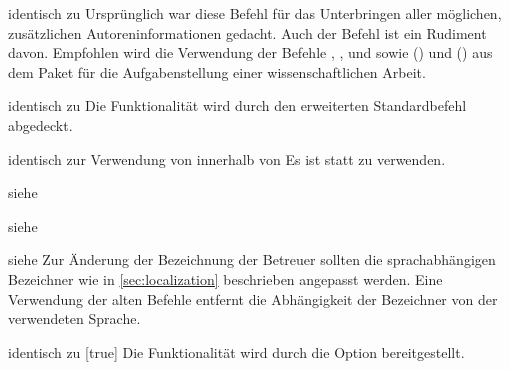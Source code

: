 \begin{Declaration*}{}
\begin{Declaration}{}{%
  identisch zu %
}
\printdeclarationlist*%
%
Ursprünglich war diese Befehl für das Unterbringen aller möglichen, 
zusätzlichen Autoreninformationen gedacht. Auch der Befehl  
ist ein Rudiment davon. Empfohlen wird die Verwendung der Befehle 
, ,  und 
 sowie () 
und () aus dem Paket 
 für die Aufgabenstellung einer wissenschaftlichen 
Arbeit.
\end{Declaration}

\begin{Declaration}{}{%
  identisch zu %
}
\printdeclarationlist*%
%
Die Funktionalität wird durch den erweiterten Standardbefehl  
abgedeckt.
\end{Declaration}

\begin{Declaration}{}{%
  identisch zur Verwendung von  innerhalb von %
}
\printdeclarationlist*%
%
Es ist 
statt  zu verwenden.
\end{Declaration}

\begin{Declaration}{}{%
  siehe %
}
\begin{Declaration}{}{%
  siehe %
}
\begin{Declaration}{}{%
  siehe %
}
\printdeclarationlist*%
%
Zur Änderung der Bezeichnung der Betreuer sollten die sprachabhängigen 
Bezeichner wie in \autoref{sec:localization} beschrieben angepasst werden. Eine 
Verwendung der alten Befehle entfernt die Abhängigkeit der Bezeichner von der 
verwendeten Sprache.
\end{Declaration}
\end{Declaration}
\end{Declaration}

\begin{Declaration}{}{%
  identisch zu [true]%
}
\printdeclarationlist*%
%
Die Funktionalität wird durch die Option  bereitgestellt.
\end{Declaration}


\end{Declaration*}
